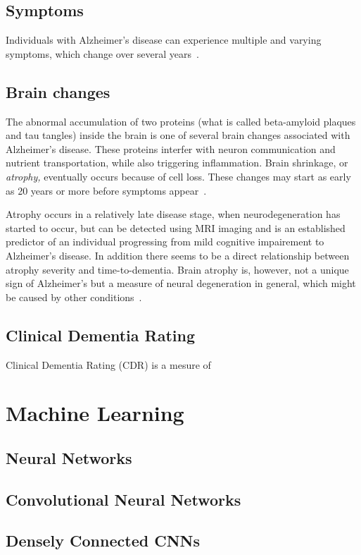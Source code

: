 \documentclass{kththesis}
\begin{document}
\subsection{Symptoms}
Individuals with Alzheimer's disease can experience multiple and varying symptoms, which change over several years~\cite{factsfigures2018}.

\subsection{Brain changes}
The abnormal accumulation of two proteins (what is called beta-amyloid plaques and tau tangles) inside the brain is one of several brain changes associated with Alzheimer's disease. These proteins interfer with neuron communication and nutrient transportation, while also triggering inflammation. Brain shrinkage, or \textit{atrophy,} eventually occurs because of cell loss. These changes may start as early as 20 years or more before symptoms appear~\cite{factsfigures2018}.

Atrophy occurs in a relatively late disease stage, when neurodegeneration has started to occur, but can be detected using MRI imaging and is an established predictor of an individual progressing from mild cognitive impairement to Alzheimer's disease. In addition there seems to be a direct relationship between atrophy severity and time-to-dementia. Brain atrophy is, however, not a unique sign of Alzheimer's but a measure of neural degeneration in general, which might be caused by other conditions~\cite{jack2010brain}.

\subsection{Clinical Dementia Rating}
Clinical Dementia Rating (CDR) is a mesure of

\section{Machine Learning}
\subsection{Neural Networks}

\subsection{Convolutional Neural Networks}
\subsection{Densely Connected CNNs}
\end{document}
